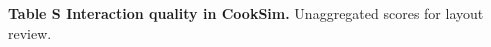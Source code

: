 \documentclass[10pt]{article}
\begin{document}
\newcommand{\ivgnotes}{}
\renewcommand{\ivgnote}[1]{\gdef\ivgnotes{#1}}

\par\vspace{6pt}
{\fontsize{8.8}{10.3}\selectfont\textsf{\textbf{Table S Interaction quality in CookSim.}} Unaggregated scores for layout review. \ivgnotes\par}
\end{document}
